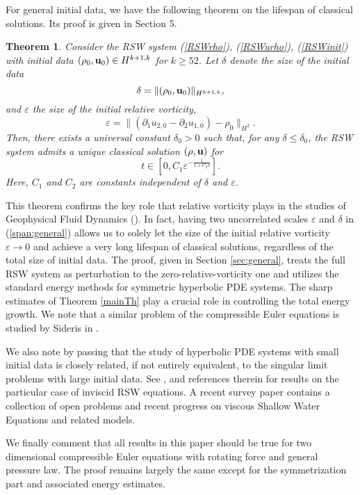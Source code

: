 \documentclass[12pt]{amsart}
\newtheorem{theorem}{Theorem}[section]
\numberwithin{equation}{section} \numberwithin{theorem}{section}
\numberwithin{example}{section} \numberwithin{remark}{section}
\numberwithin{figure}{section} \numberwithin{algorithm}{section}
\def\ep{\varepsilon}
\def\be{\begin{equation}}
\def\ee{\end{equation}}
\def\vu{{\bf u}}
\def\pa{\partial}
\def\veps{\varepsilon}
\def\Hw{H}
\begin{document}
For general initial data, we have the following theorem on the
lifespan of classical solutions. Its proof is given in Section 5.
\begin{theorem}\label{perTh}
Consider the RSW system (\ref{RSWrho}), (\ref{RSWurho}), (\ref{RSWinit}) with initial data $(\rho_0,\vu_0)\in \Hw^{k+1,k}$ for $k\ge52$. Let $\delta$ denote the size of the initial data \begin{equation*}
\delta=\|(\rho_0,\vu_0)\|_{\Hw^{k+1,k}},
\end{equation*}
 and $\veps$ the size of the initial relative vorticity,
 \[\veps=\|(\pa_1 u_{2,0}-\pa_2 u_{1,0})-\rho_0\|_{H^2}.\]
Then, there exists a universal constant $\delta_0>0$ such that, for any $\delta\le\delta_0$, the
RSW system admits a unique
classical solution $(\rho, \vu)$ for \be\label{span:general}t\in[0,
C_1\veps^{-\frac{1}{1+C_2\delta}}].\ee
Here, $C_1$ and $C_2$ are constants independent of $\delta$ and $\veps$. 
\end{theorem}

This theorem confirms the key role that relative vorticity plays in the studies of Geophysical Fluid Dynamics (\cite{Pedlosky}). In fact, having two uncorrelated scales $\veps$ and $ \delta$ in (\ref{span:general})
allows us to solely let the size of the initial relative vorticity
$\ep\to0$ and achieve a very long lifespan of classical solutions, regardless of the total size of initial data. The proof, given in Section \ref{sec:general}, treats the full RSW system as perturbation to the zero-relative-vorticity one and utilizes the standard energy methods for symmetric hyperbolic PDE systems. The sharp estimates of Theorem \ref{mainTh} play a crucial role in controlling the total energy growth. We note that a similar problem of the compressible Euler equations is studied by Sideris in \cite{Sideris:2D}.

We also note by passing that the study of hyperbolic PDE systems
with small initial data is closely related, if not entirely
equivalent, to the singular limit problems with large initial data.
See \cite{Majda}, \cite{Babin} and references therein for results on
the particular case of inviscid RSW equations. A recent survey paper
\cite{Bresch} contains a collection of open problems and recent
progress on viscous Shallow Water Equations and related models.

We finally comment that all results in this paper should be true for two dimensional compressible Euler equations with rotating force and general pressure law. The proof remains largely the same except for the symmetrization part and associated energy estimates.
\end{document}

